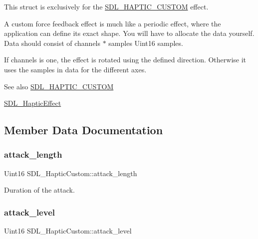 This struct is exclusively for the \hyperlink{SDL__haptic_8h_a8a18c4de1076ac9bebd718329d16db29}{S\+D\+L\+\_\+\+H\+A\+P\+T\+I\+C\+\_\+\+C\+U\+S\+T\+OM} effect.

A custom force feedback effect is much like a periodic effect, where the application can define its exact shape. You will have to allocate the data yourself. Data should consist of channels $\ast$ samples Uint16 samples.

If channels is one, the effect is rotated using the defined direction. Otherwise it uses the samples in data for the different axes.

\begin{DoxySeeAlso}{See also}
\hyperlink{SDL__haptic_8h_a8a18c4de1076ac9bebd718329d16db29}{S\+D\+L\+\_\+\+H\+A\+P\+T\+I\+C\+\_\+\+C\+U\+S\+T\+OM} 

\hyperlink{unionSDL__HapticEffect}{S\+D\+L\+\_\+\+Haptic\+Effect} 
\end{DoxySeeAlso}


\subsection{Member Data Documentation}
\mbox{\label{structSDL__HapticCustom_a018b35d89398c26e10d1fb4315d1dda1}} 
\subsubsection{\texorpdfstring{attack\+\_\+length}{attack\_length}}
{\footnotesize\ttfamily Uint16 S\+D\+L\+\_\+\+Haptic\+Custom\+::attack\+\_\+length}

Duration of the attack. \mbox{\label{structSDL__HapticCustom_ad6e394e3775372af3eb9e02823987405}} 
\subsubsection{\texorpdfstring{attack\+\_\+level}{attack\_level}}
{\footnotesize\ttfamily Uint16 S\+D\+L\+\_\+\+Haptic\+Custom\+::attack\+\_\+level}

